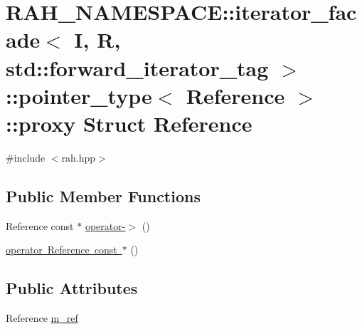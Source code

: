 \hypertarget{struct_r_a_h___n_a_m_e_s_p_a_c_e_1_1iterator__facade_3_01_i_00_01_r_00_01std_1_1forward__iterato3fe5d6b1f3640cd0444b883f952b0798}{}\section{R\+A\+H\+\_\+\+N\+A\+M\+E\+S\+P\+A\+CE\+::iterator\+\_\+facade$<$ I, R, std\+::forward\+\_\+iterator\+\_\+tag $>$\+::pointer\+\_\+type$<$ Reference $>$\+::proxy Struct Reference}
\label{struct_r_a_h___n_a_m_e_s_p_a_c_e_1_1iterator__facade_3_01_i_00_01_r_00_01std_1_1forward__iterato3fe5d6b1f3640cd0444b883f952b0798}


{\ttfamily \#include $<$rah.\+hpp$>$}

\subsection*{Public Member Functions}
\begin{DoxyCompactItemize}
\item 
Reference const  $\ast$ \mbox{\hyperlink{struct_r_a_h___n_a_m_e_s_p_a_c_e_1_1iterator__facade_3_01_i_00_01_r_00_01std_1_1forward__iterato3fe5d6b1f3640cd0444b883f952b0798_a75fc84f754825494714e93b36378c456}{operator-\/$>$}} ()
\item 
\mbox{\hyperlink{struct_r_a_h___n_a_m_e_s_p_a_c_e_1_1iterator__facade_3_01_i_00_01_r_00_01std_1_1forward__iterato3fe5d6b1f3640cd0444b883f952b0798_a6bce9882927bc5a7b969335f95d41c70}{operator Reference const $\ast$}} ()
\end{DoxyCompactItemize}
\subsection*{Public Attributes}
\begin{DoxyCompactItemize}
\item 
Reference \mbox{\hyperlink{struct_r_a_h___n_a_m_e_s_p_a_c_e_1_1iterator__facade_3_01_i_00_01_r_00_01std_1_1forward__iterato3fe5d6b1f3640cd0444b883f952b0798_a0bdb83fb57f5449a769a8b9e636fbefc}{m\+\_\+ref}}
\end{DoxyCompactItemize}


